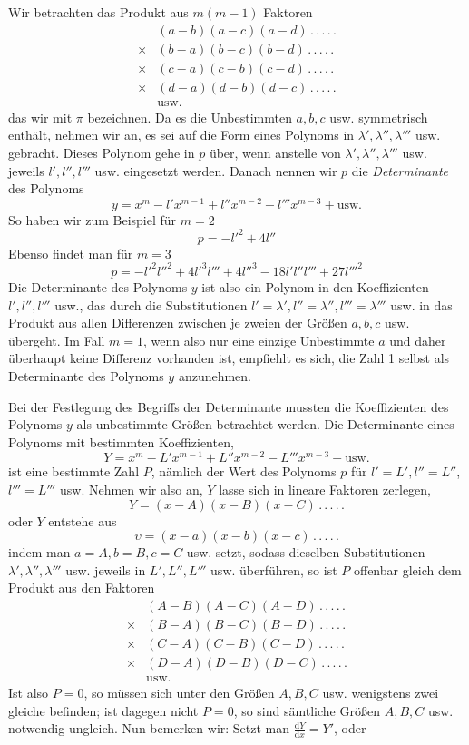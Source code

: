 Wir betrachten das Produkt aus $m(m-1)$ Faktoren
\[
\begin{aligned}
&(a-b)(a-c)(a-d)\, .\, .\, .\, .\, .\\
\times{}&(b-a)(b-c)(b-d)\, .\, .\, .\, .\, .\\
\times{}&(c-a)(c-b)(c-d)\, .\, .\, .\, .\, .\\
\times{}&(d-a)(d-b)(d-c)\, .\, .\, .\, .\, .\\
&\text{usw.}
\end{aligned}
\]
das wir mit $\pi$ bezeichnen. Da es die Unbestimmten $a,b,c$ usw. symmetrisch enthält, nehmen wir an, es sei auf die Form eines Polynoms in $\lambda',\lambda'',\lambda'''$ usw. gebracht. Dieses Polynom gehe in $p$ über, wenn anstelle von $\lambda',\lambda'',\lambda'''$ usw. jeweils $l',l'',l'''$ usw. eingesetzt werden. Danach nennen wir $p$ die \textit{Determinante} des Polynoms
\[
y=x^m-l'x^{m-1}+l''x^{m-2}-l'''x^{m-3}+\text{usw.}
\]
So haben wir zum Beispiel für $m=2$
\[
p=-{l'}^2+4l''
\]
Ebenso findet man für $m=3$
\[
p=-{l'}^2{l''}^2+4{l'}^3l'''+4{l''}^3-18l'l''l'''+27{l'''}^2
\]
Die Determinante des Polynoms $y$ ist also ein Polynom in den Koeffizienten $l',l'',l'''$ usw., das durch die Substitutionen $l'=\lambda',l''=\lambda'',l'''=\lambda'''$ usw. in das Produkt aus allen Differenzen zwischen je zweien der Größen $a,b,c$ usw. übergeht. Im Fall $m=1$, wenn also nur eine einzige Unbestimmte $a$ und daher überhaupt keine Differenz vorhanden ist, empfiehlt es sich, die Zahl 1 selbst als Determinante des Polynoms $y$ anzunehmen.

Bei der Festlegung des Begriffs der Determinante mussten die Koeffizienten des Polynoms $y$ als unbestimmte Größen betrachtet werden. Die Determinante eines Polynoms mit bestimmten Koeffizienten,
\[
Y=x^m-L'x^{m-1}+L''x^{m-2}-L'''x^{m-3}+\text{usw.}
\]
ist eine bestimmte Zahl $P$, nämlich der Wert des Polynoms $p$ für $l'=L',l''=L''$, $l'''=L'''$ usw. Nehmen wir also an, $Y$ lasse sich in lineare Faktoren zerlegen,
\[
Y=(x-A)(x-B)(x-C)\, .\, .\, .\, .\, .
\]
oder $Y$ entstehe aus
\[
\upsilon=(x-a)(x-b)(x-c)\, .\, .\, .\, .\, .
\]
indem man $a=A,b=B,c=C$ usw. setzt, sodass dieselben Substitutionen $\lambda',\lambda'',\lambda'''$ usw. jeweils in $L',L'',L'''$ usw. überführen, so ist $P$ offenbar gleich dem Produkt aus den Faktoren
\[
\begin{aligned}
&(A-B)(A-C)(A-D)\, .\, .\, .\, .\, .\\
\times{}&(B-A)(B-C)(B-D)\, .\, .\, .\, .\, .\\
\times{}&(C-A)(C-B)(C-D)\, .\, .\, .\, .\, .\\
\times{}&(D-A)(D-B)(D-C)\, .\, .\, .\, .\, .\\
&\text{usw.}
\end{aligned}
\]
Ist also $P=0$, so müssen sich unter den Größen $A,B,C$ usw. wenigstens zwei gleiche befinden; ist dagegen nicht $P=0$, so sind sämtliche Größen $A,B,C$ usw. notwendig ungleich. Nun bemerken wir: Setzt man $\frac{\mathrm dY}{\mathrm dx}=Y'$, oder

